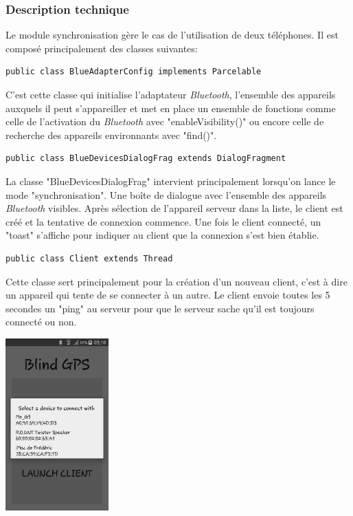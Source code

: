 \subsubsection{Description technique}

Le module synchronisation gère le cas de l'utilisation de deux téléphones. Il est composé principalement des classes suivantes:

\begin{lstlisting}
public class BlueAdapterConfig implements Parcelable 
\end{lstlisting}

C'est cette classe qui initialise l'adaptateur \textit{Bluetooth}, l'ensemble des appareils auxquels il peut s'appareiller et met en place un ensemble de fonctions comme celle de l'activation du \textit{Bluetooth} avec "enableVisibility()" ou encore celle de recherche des appareils environnants avec "find()".

\begin{lstlisting}
public class BlueDevicesDialogFrag extends DialogFragment
\end{lstlisting}

La classe "BlueDevicesDialogFrag" intervient principalement lorsqu'on lance le mode "synchronisation". Une boîte de dialogue avec l'ensemble des appareils \textit{Bluetooth} visibles. Après sélection de l'appareil serveur dans la liste, le client est créé et la tentative de connexion commence. Une fois le client connecté, un "toast" s'affiche pour indiquer au client que la connexion s'est bien établie.

\begin{lstlisting}
public class Client extends Thread 
\end{lstlisting}

Cette classe sert principalement pour la création d'un nouveau client, c'est à dire un appareil qui tente de se connecter à un autre. Le client envoie toutes les 5 secondes un "ping" au serveur pour que le serveur sache qu'il est toujours connecté ou non.

\begin{center}
\includegraphics[height=250px]{Assets/client.png}
\end{center}

